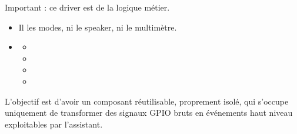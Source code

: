 \documentclass[letterpaper,10pt,french]{sphinxmanual}
\begin{document}
\sphinxAtStartPar
Important : ce driver est  de la logique métier.
\begin{itemize}
\item {} 
\sphinxAtStartPar
Il  les modes, ni le speaker, ni le multimètre.

\item {} \begin{description}
\begin{itemize}
\item {} 
\sphinxAtStartPar
{}

\item {} 
\sphinxAtStartPar
{}

\item {} 
\sphinxAtStartPar
{}

\item {} 
\sphinxAtStartPar
{}

\end{itemize}

\end{description}

\end{itemize}

\sphinxAtStartPar
L’objectif est d’avoir un composant réutilisable, proprement isolé, qui
s’occupe uniquement de transformer des signaux GPIO bruts en événements
haut niveau exploitables par l’assistant.
\end{document}
